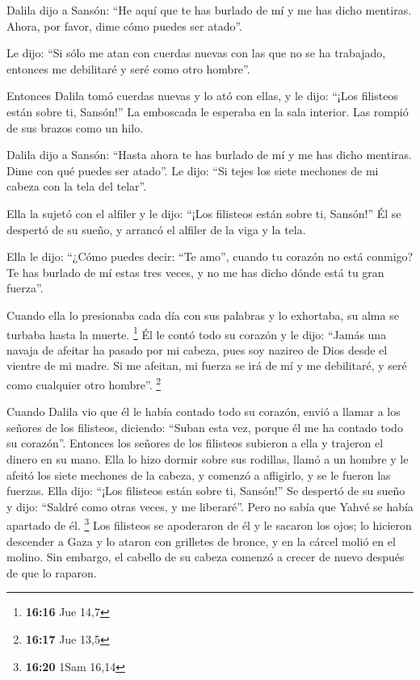 \begin{paracol}{2}
 Dalila dijo a Sansón: ``He aquí que te has burlado de mí
y me has dicho mentiras. Ahora, por favor, dime cómo puedes ser atado''.

 Le dijo: ``Si sólo me atan con cuerdas nuevas con las
que no se ha trabajado, entonces me debilitaré y seré como otro
hombre''.

 Entonces Dalila tomó cuerdas nuevas y lo ató con ellas,
y le dijo: ``¡Los filisteos están sobre ti, Sansón!'' La emboscada le
esperaba en la sala interior. Las rompió de sus brazos como un hilo.

 Dalila dijo a Sansón: ``Hasta ahora te has burlado de mí
y me has dicho mentiras. Dime con qué puedes ser atado''. Le dijo: ``Si
tejes los siete mechones de mi cabeza con la tela del telar''.

 Ella la sujetó con el alfiler y le dijo: ``¡Los
filisteos están sobre ti, Sansón!'' Él se despertó de su sueño, y
arrancó el alfiler de la viga y la tela.

 Ella le dijo: ``¿Cómo puedes decir: ``Te amo'', cuando
tu corazón no está conmigo? Te has burlado de mí estas tres veces, y no
me has dicho dónde está tu gran fuerza''.

 Cuando ella lo presionaba cada día con sus palabras y lo
exhortaba, su alma se turbaba hasta la muerte. \footnote{\textbf{16:16}
  Jue 14,7}  Él le contó todo su corazón y le dijo:
``Jamás una navaja de afeitar ha pasado por mi cabeza, pues soy nazireo
de Dios desde el vientre de mi madre. Si me afeitan, mi fuerza se irá de
mí y me debilitaré, y seré como cualquier otro hombre''. \footnote{\textbf{16:17}
  Jue 13,5}

 Cuando Dalila vio que él le había contado todo su
corazón, envió a llamar a los señores de los filisteos, diciendo:
``Suban esta vez, porque él me ha contado todo su corazón''. Entonces
los señores de los filisteos subieron a ella y trajeron el dinero en su
mano.  Ella lo hizo dormir sobre sus rodillas, llamó a un
hombre y le afeitó los siete mechones de la cabeza, y comenzó a
afligirlo, y se le fueron las fuerzas.  Ella dijo: ``¡Los
filisteos están sobre ti, Sansón!'' Se despertó de su sueño y dijo:
``Saldré como otras veces, y me liberaré''. Pero no sabía que Yahvé se
había apartado de él. \footnote{\textbf{16:20} 1Sam 16,14}
 Los filisteos se apoderaron de él y le sacaron los ojos;
lo hicieron descender a Gaza y lo ataron con grilletes de bronce, y en
la cárcel molió en el molino.  Sin embargo, el cabello de
su cabeza comenzó a crecer de nuevo después de que lo raparon.


\end{paracol}
